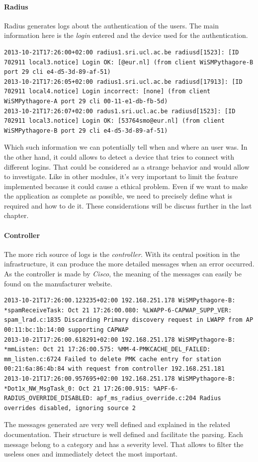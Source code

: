 \paragraph{Radius}
Radius generates logs about the authentication of the users. The main information here is the \emph{login} entered and the device used for the authentication.
\begin{lstlisting}[frame=single,breaklines=true,caption={Radius logs}]
2013-10-21T17:26:00+02:00 radius1.sri.ucl.ac.be radiusd[1523]: [ID 702911 local3.notice] Login OK: [@eur.nl] (from client WiSMPythagore-B port 29 cli e4-d5-3d-89-af-51)
2013-10-21T17:26:05+02:00 radius1.sri.ucl.ac.be radiusd[17913]: [ID 702911 local4.notice] Login incorrect: [none] (from client WiSMPythagore-A port 29 cli 00-11-e1-db-fb-5d)
2013-10-21T17:26:07+02:00 radus1.sri.ucl.ac.be radiusd[1523]: [ID 702911 local3.notice] Login OK: [53764smo@eur.nl] (from client WiSMPythagore-B port 29 cli e4-d5-3d-89-af-51)
\end{lstlisting}
Which such information we can potentially tell when and where an user was. In the other hand, it could allows to detect a device that tries to connect with different logins. That could be considered as a strange behavior and would allow to investigate. Like in other modules, it's very important to limit the feature implemented because it could cause a ethical problem. Even if we want to make the application as complete as possible, we need to precisely define what is required and how to de it. These considerations will be discuss further in the last chapter.

\paragraph{Controller}
The more rich source of logs is the \emph{controller}. With its central position in the infrastructure, it can produce the more detailed messages when an error occurred. As the controller is made by \emph{Cisco}, the meaning of the messages can easily be found on the manufacturer website\cite{syslogCisco}.
\begin{lstlisting}[frame=single,breaklines=true,caption={Controller logs}]
2013-10-21T17:26:00.123235+02:00 192.168.251.178 WiSMPythagore-B: *spamReceiveTask: Oct 21 17:26:00.080: %LWAPP-6-CAPWAP_SUPP_VER: spam_lrad.c:1835 Discarding Primary discovery request in LWAPP from AP 00:11:bc:1b:14:00 supporting CAPWAP
2013-10-21T17:26:00.618291+02:00 192.168.251.178 WiSMPythagore-B: *mmListen: Oct 21 17:26:00.575: %MM-4-PMKCACHE_DEL_FAILED: mm_listen.c:6724 Failed to delete PMK cache entry for station 00:21:6a:86:4b:84 with request from controller 192.168.251.181
2013-10-21T17:26:00.957695+02:00 192.168.251.178 WiSMPythagore-B: *Dot1x_NW_MsgTask_0: Oct 21 17:26:00.915: %APF-6-RADIUS_OVERRIDE_DISABLED: apf_ms_radius_override.c:204 Radius overrides disabled, ignoring source 2 
\end{lstlisting}
The messages generated are very well defined and explained in the related documentation. Their structure is well defined and facilitate the parsing. Each message belong to a category and has a severity level. That allows to filter the useless ones and immediately detect the most important.

